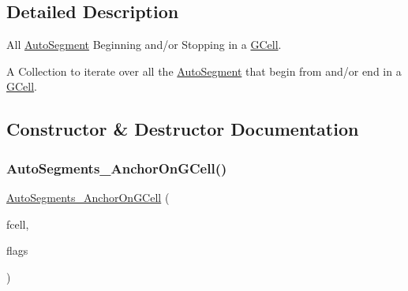 \subsection{Detailed Description}
All \mbox{\hyperlink{classKatabatic_1_1AutoSegment}{Auto\+Segment}} Beginning and/or Stopping in a \mbox{\hyperlink{classKatabatic_1_1GCell}{G\+Cell}}. 

A Collection to iterate over all the \mbox{\hyperlink{classKatabatic_1_1AutoSegment}{Auto\+Segment}} that begin from and/or end in a \mbox{\hyperlink{classKatabatic_1_1GCell}{G\+Cell}}. 

\subsection{Constructor \& Destructor Documentation}
\mbox{\label{classKatabatic_1_1AutoSegments__AnchorOnGCell_a41a8dace22db3bdd8ecbf1850344f885}} 
\subsubsection{\texorpdfstring{Auto\+Segments\+\_\+\+Anchor\+On\+G\+Cell()}{AutoSegments\_AnchorOnGCell()}\hspace{0.1cm}{\footnotesize\ttfamily [1/2]}}
{\footnotesize\ttfamily \mbox{\hyperlink{classKatabatic_1_1AutoSegments__AnchorOnGCell}{Auto\+Segments\+\_\+\+Anchor\+On\+G\+Cell}} (\begin{DoxyParamCaption}\item[{\mbox{\hyperlink{classKatabatic_1_1GCell}{G\+Cell}} $\ast$}]{fcell,  }\item[{unsigned int}]{flags }\end{DoxyParamCaption})\hspace{0.3cm}{\ttfamily [inline]}}

